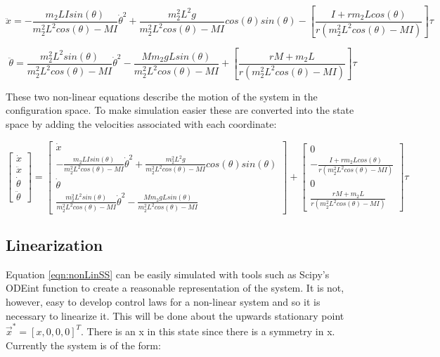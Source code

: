 \documentclass{article}
\begin{document}
	\begin{equation}
		\label{eqn:linAcc}
		\ddot{x} = - \frac{m_2 LIsin(\theta)}{m_2^2 L^2 cos(\theta) - MI}\dot{\theta}^2 + \frac{m_2^2 L^2 g}{m_2^2 L^2 cos(\theta) - MI}cos(\theta)sin(\theta) - \left[ \frac{I + rm_2 Lcos(\theta)}{r(m_2^2 L^2 cos(\theta) - MI)} \right] \tau
	\end{equation}
	
	\begin{equation}
		\label{eqn:angAcc}
		\ddot{\theta} = \frac{m_2^2 L^2 sin(\theta)}{m_2^2 L^2 cos(\theta) - MI}\dot{\theta}^2 - \frac{Mm_2 gLsin(\theta)}{m_2^2 L^2 cos(\theta) - MI} + \left[ \frac{rM + m_2 L}{r(m_2^2 L^2 cos(\theta) - MI)} \right] \tau
	\end{equation}
	
	These two non-linear equations describe the motion of the system in the configuration space. To make simulation easier these are converted into the state space by adding the velocities associated with each coordinate:
	
	\begin{equation}
		\label{eqn:nonLinSS}
		\begin{bmatrix}
			\dot{x} 		\\
			\ddot{x}		\\
			\dot{\theta}	\\
			\ddot{\theta}
		\end{bmatrix}
		=		
		\begin{bmatrix}
			\dot{x}			\\
			-\frac{m_2 LIsin(\theta)}{m_2^2 L^2 cos(\theta) - MI}\dot{\theta}^2 + \frac{m_2^2 L^2 g}{m_2^2 L^2 cos(\theta) - MI}cos(\theta)sin(\theta)			\\
			\dot{\theta}	\\
			\frac{m_2^2 L^2 sin(\theta)}{m_2^2 L^2 cos(\theta) - MI}\dot{\theta}^2 - \frac{Mm_2 gLsin(\theta)}{m_2^2 L^2 cos(\theta) - MI}
		\end{bmatrix}
		+
		\begin{bmatrix}
			0																	\\
			-\frac{I + rm_2 Lcos(\theta)}{r(m_2^2 L^2 cos(\theta) - MI)}		\\
			0																	\\
			\frac{rM + m_2 L}{r(m_2^2 L^2 cos(\theta) - MI)}
		\end{bmatrix}
		\tau
	\end{equation}
	
	\subsection{Linearization}
	Equation \ref{eqn:nonLinSS} can be easily simulated with tools such as Scipy's ODEint function to create a reasonable representation of the system. It is not, however, easy to develop control laws for a non-linear system and so it is necessary to linearize it. This will be done about the upwards stationary point $\vec{x}^* = [x, 0, 0, 0]^T$. There is an x in this state since there is a symmetry in x. Currently the system is of the form:
	
\end{document}
